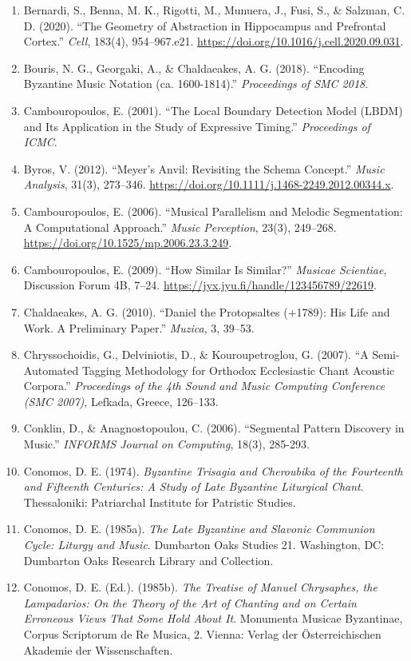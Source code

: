 \documentclass[11pt,a4paper]{article}
\begin{document}
\begin{enumerate}
\item
 Bernardi, S., Benna, M. K., Rigotti, M., Munuera, J., Fusi, S., \& Salzman, C. D. (2020). ``The Geometry of Abstraction in Hippocampus and Prefrontal Cortex.'' \emph{Cell}, 183(4), 954--967.e21. \url{https://doi.org/10.1016/j.cell.2020.09.031}.
\item
 Bouris, N. G., Georgaki, A., \& Chaldaeakes, A. G. (2018). ``Encoding Byzantine Music Notation (ca. 1600-1814).'' \emph{Proceedings of SMC 2018}.
\item
 Cambouropoulos, E. (2001). ``The Local Boundary Detection Model (LBDM) and Its Application in the Study of Expressive Timing.'' \emph{Proceedings of ICMC}.
\item
 Byros, V. (2012). ``Meyer's Anvil: Revisiting the Schema Concept.'' \emph{Music Analysis}, 31(3), 273--346. \url{https://doi.org/10.1111/j.1468-2249.2012.00344.x}.
\item
 Cambouropoulos, E. (2006). ``Musical Parallelism and Melodic Segmentation: A Computational Approach.'' \emph{Music Perception}, 23(3), 249--268. \url{https://doi.org/10.1525/mp.2006.23.3.249}.
\item
 Cambouropoulos, E. (2009). ``How Similar Is Similar?'' \emph{Musicae Scientiae}, Discussion Forum 4B, 7--24. \url{https://jyx.jyu.fi/handle/123456789/22619}.
\item
 Chaldaeakes, A. G. (2010). ``Daniel the Protopsaltes (+1789): His Life and Work. A Preliminary Paper.'' \emph{Muzica}, 3, 39--53.
\item
 Chryssochoidis, G., Delviniotis, D., \& Kouroupetroglou, G. (2007). ``A Semi-Automated Tagging Methodology for Orthodox Ecclesiastic Chant Acoustic Corpora.'' \emph{Proceedings of the 4th Sound and Music Computing Conference (SMC 2007)}, Lefkada, Greece, 126--133.
\item
 Conklin, D., \& Anagnostopoulou, C. (2006). ``Segmental Pattern Discovery in Music.'' \emph{INFORMS Journal on Computing}, 18(3), 285-293.
\item
 Conomos, D. E. (1974). \emph{Byzantine Trisagia and Cheroubika of the Fourteenth and Fifteenth Centuries: A Study of Late Byzantine Liturgical Chant}. Thessaloniki: Patriarchal Institute for Patristic Studies.
\item
 Conomos, D. E. (1985a). \emph{The Late Byzantine and Slavonic Communion Cycle: Liturgy and Music}. Dumbarton Oaks Studies 21. Washington, DC: Dumbarton Oaks Research Library and Collection.
\item
 Conomos, D. E. (Ed.). (1985b). \emph{The Treatise of Manuel Chrysaphes, the Lampadarios: On the Theory of the Art of Chanting and on Certain Erroneous Views That Some Hold About It}. Monumenta Musicae Byzantinae, Corpus Scriptorum de Re Musica, 2. Vienna: Verlag der Österreichischen Akademie der Wissenschaften.

\end{enumerate}
\end{document}
